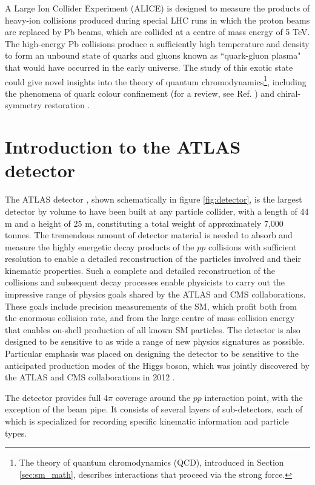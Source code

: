 A Large Ion Collider Experiment (ALICE) \cite{ALICE} is designed to measure the products of heavy-ion collisions produced during special LHC runs in which the proton beams are replaced by Pb beams, which are collided at a centre of mass energy of 5 TeV. The high-energy Pb collisions produce a sufficiently high temperature and density to form an unbound state of quarks and gluons known as ``quark-gluon plasma" that would have occurred in the early universe. The study of this exotic state could give novel insights into the theory of quantum chromodynamics\footnote{The theory of quantum chromodynamics (QCD), introduced in Section \ref{sec:sm_math}, describes interactions that proceed via the strong force.}, including the phenomena of quark colour confinement (for a review, see Ref. \cite{quark_confinement}) and chiral-symmetry restoration \cite{Karsch:845568}.


\section{Introduction to the ATLAS detector}
\label{sec:ATLAS_detector_intro}

The ATLAS detector \cite{atlas}, shown schematically in figure \ref{fig:detector}, is the largest detector by volume to have been built at any particle collider, with a length of 44 m and a height of 25 m, constituting a total weight of approximately 7,000 tonnes. The tremendous amount of detector material is needed to absorb and measure the highly energetic decay products of the \(pp\) collisions with sufficient resolution to enable a detailed reconstruction of the particles involved and their kinematic properties. Such a complete and detailed reconstruction of the collisions and subsequent decay processes enable physicists to carry out the impressive range of physics goals shared by the ATLAS and CMS collaborations. These goals include precision measurements of the SM, which profit both from the enormous collision rate, and from the large centre of mass collision energy that enables on-shell production of all known SM particles. The detector is also designed to be sensitive to as wide a range of new physics signatures as possible. Particular emphasis was placed on designing the detector to be sensitive to the anticipated production modes of the Higgs boson, which was jointly discovered by the ATLAS and CMS collaborations in 2012 \cite{atlas_higgs_2012, cms_higgs_2012}. 

The detector provides full 4\(\pi\) coverage around the \(pp\) interaction point, with the exception of the beam pipe. It consists of several layers of sub-detectors, each of which is specialized for recording specific kinematic information and particle types.

